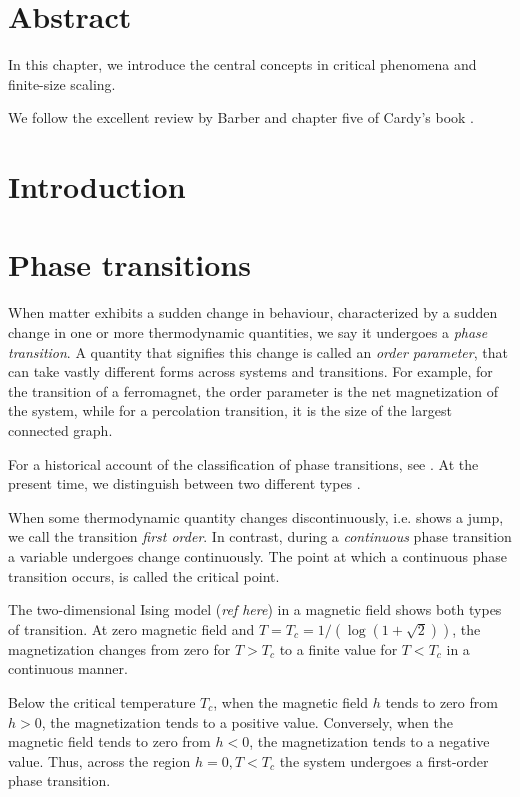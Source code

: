 \section{Abstract}

In this chapter, we introduce the central concepts in critical phenomena
and finite-size scaling.

We follow the excellent review by Barber \cite{barber1983finite} and
chapter five of Cardy's book \cite{cardy1996scaling}.

\section{Introduction}

\section{Phase transitions}
When matter exhibits a sudden change in behaviour, characterized by a sudden change in one or more thermodynamic
quantities, we say it undergoes a \emph{phase transition}.
A quantity that signifies this change is called an \emph{order parameter},
that can take vastly different forms across systems and transitions.
For example, for the transition of a ferromagnet, the order parameter is the net magnetization of the system,
while for a percolation transition, it is the size of the largest connected graph.

For a historical account of the classification of phase transitions,
see \cite{jaeger1998ehrenfest}.
At the present time, we distinguish between two different types \cite{kadanoff2009more}.

When some thermodynamic quantity changes discontinuously, i.e.
shows a jump, we call the transition \emph{first order}.
In contrast, during a \emph{continuous} phase transition a variable undergoes change continuously.
The point at which a continuous phase transition occurs, is called the critical point.

The two-dimensional Ising model (\emph{ref here}) in a magnetic field shows both types of transition.
At zero magnetic field and $T = T_c = 1 / (\log(1 + \sqrt{2}))$, the magnetization changes from zero for $T > T_c$ to
a finite value for $T < T_c$ in a continuous manner.

Below the critical temperature $T_c$, when the magnetic field $h$ tends to zero from $h > 0$,
the magnetization tends to a positive value.
Conversely, when the magnetic field tends to zero from $h < 0$,
the magnetization tends to a negative value.
Thus, across the region $h = 0, T < T_c$ the system undergoes a first-order phase transition.

